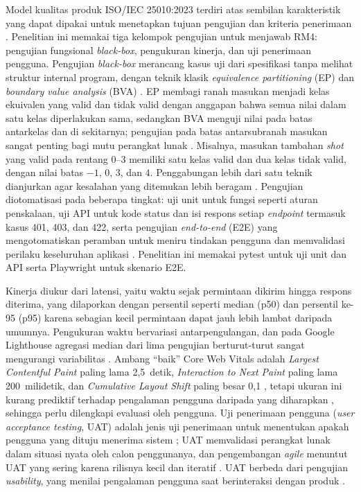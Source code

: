 Model kualitas produk ISO/IEC 25010:2023 terdiri atas sembilan karakteristik yang dapat dipakai untuk menetapkan tujuan pengujian dan kriteria penerimaan \citep*{isoiec2023systems}. Penelitian ini memakai tiga kelompok pengujian untuk menjawab RM4: pengujian fungsional \textit{black-box}, pengukuran kinerja, dan uji penerimaan pengguna. Pengujian \textit{black-box} merancang kasus uji dari spesifikasi tanpa melihat struktur internal program, dengan teknik klasik \textit{equivalence partitioning} (EP) dan \textit{boundary value analysis} (BVA) \citep*{myers2012art}. EP membagi ranah masukan menjadi kelas ekuivalen yang valid dan tidak valid dengan anggapan bahwa semua nilai dalam satu kelas diperlakukan sama, sedangkan BVA menguji nilai pada batas antarkelas dan di sekitarnya; pengujian pada batas antarsubranah masukan sangat penting bagi mutu perangkat lunak \citep*{dobslaw2023automated}. Misalnya, masukan tambahan \textit{shot} yang valid pada rentang 0--3 memiliki satu kelas valid dan dua kelas tidak valid, dengan nilai batas $-1$, $0$, $3$, dan $4$. Penggabungan lebih dari satu teknik dianjurkan agar kesalahan yang ditemukan lebih beragam \citep*{siahaan2022elearning}. Pengujian diotomatisasi pada beberapa tingkat: uji unit untuk fungsi seperti aturan penskalaan, uji API untuk kode status dan isi respons setiap \textit{endpoint} termasuk kasus 401, 403, dan 422, serta pengujian \textit{end-to-end} (E2E) yang mengotomatiskan peramban untuk meniru tindakan pengguna dan memvalidasi perilaku keseluruhan aplikasi \citep*{leotta2023challenges}. Penelitian ini memakai pytest \citep{krekel2004pytest} untuk uji unit dan API serta Playwright \citep*{microsoft2026playwright} untuk skenario E2E.

Kinerja diukur dari latensi, yaitu waktu sejak permintaan dikirim hingga respons diterima, yang dilaporkan dengan persentil seperti median (p50) dan persentil ke-95 (p95) karena sebagian kecil permintaan dapat jauh lebih lambat daripada umumnya. Pengukuran waktu bervariasi antarpengulangan, dan pada Google Lighthouse agregasi median dari lima pengujian berturut-turut sangat mengurangi variabilitas \citep*{hericko2021representative}. Ambang ``baik'' Core Web Vitals adalah \textit{Largest Contentful Paint} paling lama 2,5~detik, \textit{Interaction to Next Paint} paling lama 200~milidetik, dan \textit{Cumulative Layout Shift} paling besar 0,1 \citep*{walton2024web}, tetapi ukuran ini kurang prediktif terhadap pengalaman pengguna daripada yang diharapkan \citep*{wehner2023agree}, sehingga perlu dilengkapi evaluasi oleh pengguna. Uji penerimaan pengguna (\textit{user acceptance testing}, UAT) adalah jenis uji penerimaan untuk menentukan apakah pengguna yang dituju menerima sistem \citep*{istqb2026user}; UAT memvalidasi perangkat lunak dalam situasi nyata oleh calon penggunanya, dan pengembangan \textit{agile} menuntut UAT yang sering karena rilisnya kecil dan iteratif \citep*{otaduy2017user}. UAT berbeda dari pengujian \textit{usability}, yang menilai pengalaman pengguna saat berinteraksi dengan produk \citep*{vanesha2024comparison}.

